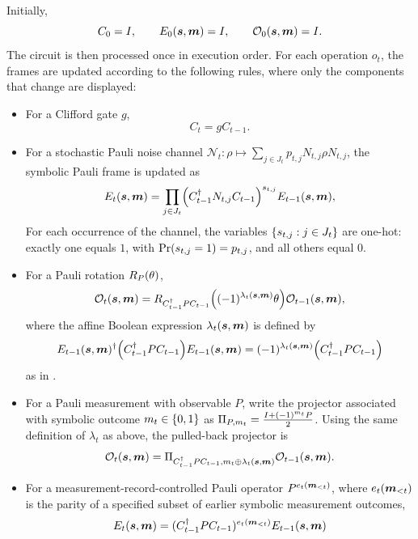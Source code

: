 \documentclass[a4paper,onecolumn,unpublished]{quantumarticle}
\newcommand{\cref}[1]{\zcref{#1}}
\DeclarePairedDelimiter\rbra{\lparen}{\rparen}
\DeclarePairedDelimiter\cbra{\{}{\}}
\newcommand{\cN}{\mathcal{N}}
\newcommand{\cO}{\mathcal{O}}
\begin{document}
Initially,
\begin{equation*}
    C_0=I,
    \qquad
    E_0\rbra{\bm{s},\bm{m}}=I,
    \qquad
    \cO_0\rbra{\bm{s},\bm{m}}=I.
\end{equation*}
The circuit is then processed once in execution order.
For each operation $o_t$, the frames are updated according to the following rules, where only the components that change are displayed:
\begin{itemize}
    \item For a Clifford gate $g$,
    \begin{equation*}
        C_t = g C_{t-1}.
    \end{equation*}
    \item For a stochastic Pauli noise channel $\cN_t: \rho \mapsto \sum_{j\in J_t}p_{t,j}N_{t,j}\rho N_{t,j}$, the symbolic Pauli frame is updated as
    \begin{equation*}
        E_t\rbra{\bm{s}, \bm{m}} = \prod_{j\in J_t}\rbra*{C_{t-1}^{\dagger} N_{t,j} C_{t-1}}^{s_{t,j}} E_{t-1}\rbra{\bm{s},\bm{m}},
    \end{equation*}
    For each occurrence of the channel, the variables $\cbra{s_{t,j}:j\in J_t}$ are one-hot: exactly one equals $1$, with $\Pr\rbra{s_{t,j}=1}=p_{t,j}$, and all others equal $0$.
    \item For a Pauli rotation $R_{P}\rbra{\theta}$,
    \begin{equation*}
        \cO_{t}\rbra{\bm{s},\bm{m}} = R_{C^{\dagger}_{t-1}P C_{t-1}}\rbra*{\rbra{-1}^{\lambda_t\rbra{\bm{s},\bm{m}}}\theta}\cO_{t-1}\rbra{\bm{s},\bm{m}},
    \end{equation*}
    where the affine Boolean expression $\lambda_t\rbra{\bm{s},\bm{m}}$ is defined by
    \begin{equation*}
        E_{t-1}\rbra{\bm{s}, \bm{m}}^{\dagger} \rbra*{C^{\dagger}_{t-1}P C_{t-1}} E_{t-1}\rbra{\bm{s}, \bm{m}} = \rbra{-1}^{\lambda_t\rbra{\bm{s},\bm{m}}} \rbra*{C^{\dagger}_{t-1}P C_{t-1}}
    \end{equation*}
    as in \cref{eq:symbolic-noise-sign}.
    \item For a Pauli measurement with observable $P$, write the projector associated with symbolic outcome $m_t \in \cbra{0,1}$ as $\Pi_{P, m_t} = \frac{I+\rbra{-1}^{m_t}P}{2}$. Using the same definition of $\lambda_t$ as above, the pulled-back projector is
    \begin{equation*}
        \cO_{t}\rbra{\bm{s},\bm{m}} = \Pi_{C_{t-1}^{\dagger}P C_{t-1}, m_t\oplus \lambda_t\rbra{\bm{s},\bm{m}}} \cO_{t-1}\rbra{\bm{s},\bm{m}}.
    \end{equation*}
    \item For a measurement-record-controlled Pauli operator $P^{e_t\rbra*{\bm{m}_{<t}}}$, where $e_t\rbra*{\bm{m}_{<t}}$ is the parity of a specified subset of earlier symbolic measurement outcomes,
    \begin{equation*}
        E_{t}\rbra{\bm{s},\bm{m}} = \rbra{C_{t-1}^{\dagger}PC_{t-1}}^{e_{t}\rbra*{\bm{m}_{<t}}} E_{t-1}\rbra{\bm{s},\bm{m}}
    \end{equation*}
\end{itemize}
\end{document}
